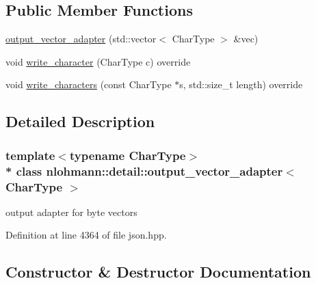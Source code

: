 \subsection*{Public Member Functions}
\begin{DoxyCompactItemize}
\item 
\hyperlink{classnlohmann_1_1detail_1_1output__vector__adapter_abc6695e8c0274afad31bd581c8acf24f}{output\+\_\+vector\+\_\+adapter} (std\+::vector$<$ Char\+Type $>$ \&vec)
\item 
void \hyperlink{classnlohmann_1_1detail_1_1output__vector__adapter_af6a22d4210bb7bc2da66021300ddd6db}{write\+\_\+character} (Char\+Type c) override
\item 
void \hyperlink{classnlohmann_1_1detail_1_1output__vector__adapter_ad6f6c461dec7bedd5359454dc22fc9aa}{write\+\_\+characters} (const Char\+Type $\ast$s, std\+::size\+\_\+t length) override
\end{DoxyCompactItemize}


\subsection{Detailed Description}
\subsubsection*{template$<$typename Char\+Type$>$\\*
class nlohmann\+::detail\+::output\+\_\+vector\+\_\+adapter$<$ Char\+Type $>$}

output adapter for byte vectors 

Definition at line 4364 of file json.\+hpp.



\subsection{Constructor \& Destructor Documentation}
